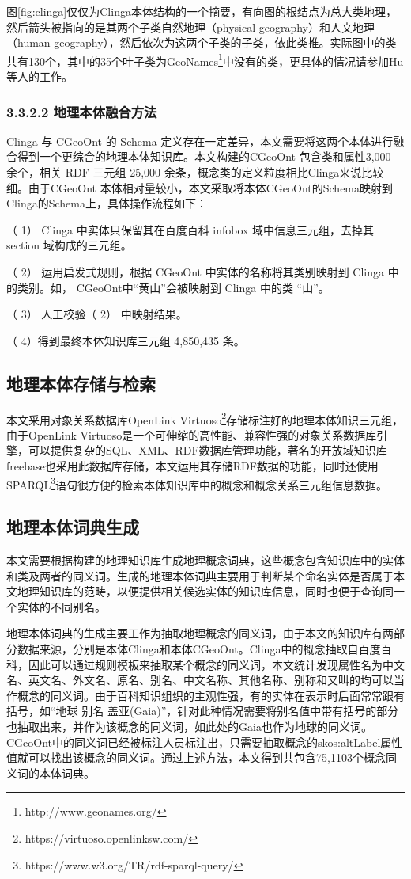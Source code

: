 图\ref{fig:clinga}仅仅为Clinga本体结构的一个摘要，有向图的根结点为总大类地理，然后箭头被指向的是其两个子类自然地理（physical geography）和人文地理（human geography），然后依次为这两个子类的子类，依此类推。实际图中的类共有130个，其中的35个叶子类为GeoNames\footnote{http://www.geonames.org/}中没有的类，更具体的情况请参加Hu等人的工作。

\subsubsection{3.3.2.2 地理本体融合方法}
Clinga 与 CGeoOnt 的 Schema 定义存在一定差异，本文需要将这两个本体进行融合得到一个更综合的地理本体知识库。本文构建的CGeoOnt 包含类和属性3,000 余个，相关 RDF 三元组 25,000 余条，概念类的定义粒度相比Clinga来说比较细。由于CGeoOnt 本体相对量较小，本文采取将本体CGeoOnt的Schema映射到Clinga的Schema上，具体操作流程如下：

（ 1） Clinga 中实体只保留其在百度百科 infobox 域中信息三元组，去掉其 section 域构成的三元组。

（ 2） 运用启发式规则，根据 CGeoOnt 中实体的名称将其类别映射到 Clinga 中的类别。如， CGeoOnt中“黄山”会被映射到 Clinga 中的类 “山”。

（ 3） 人工校验（ 2） 中映射结果。

（ 4）得到最终本体知识库三元组 4,850,435 条。

\subsection{地理本体存储与检索}

本文采用对象关系数据库OpenLink Virtuoso\footnote{https://virtuoso.openlinksw.com/}存储标注好的地理本体知识三元组，由于OpenLink Virtuoso是一个可伸缩的高性能、兼容性强的对象关系数据库引擎，可以提供复杂的SQL、XML、RDF数据库管理功能，著名的开放域知识库freebase也采用此数据库存储，本文运用其存储RDF数据的功能，同时还使用SPARQL\footnote{https://www.w3.org/TR/rdf-sparql-query/}语句很方便的检索本体知识库中的概念和概念关系三元组信息数据。

\subsection{地理本体词典生成}
本文需要根据构建的地理知识库生成地理概念词典，这些概念包含知识库中的实体和类及两者的同义词。生成的地理本体词典主要用于判断某个命名实体是否属于本文地理知识库的范畴，以便提供相关候选实体的知识库信息，同时也便于查询同一个实体的不同别名。

地理本体词典的生成主要工作为抽取地理概念的同义词，由于本文的知识库有两部分数据来源，分别是本体Clinga和本体CGeoOnt。Clinga中的概念抽取自百度百科，因此可以通过规则模板来抽取某个概念的同义词，本文统计发现属性名为中文名、英文名、外文名、原名、别名、中文名称、其他名称、别称和又叫的均可以当作概念的同义词。由于百科知识组织的主观性强，有的实体在表示时后面常常跟有括号，如“地球 别名 盖亚(Gaia)”，针对此种情况需要将别名值中带有括号的部分也抽取出来，并作为该概念的同义词，如此处的Gaia也作为地球的同义词。CGeoOnt中的同义词已经被标注人员标注出，只需要抽取概念的skos:altLabel属性值就可以找出该概念的同义词。通过上述方法，本文得到共包含75,1103个概念同义词的本体词典。

